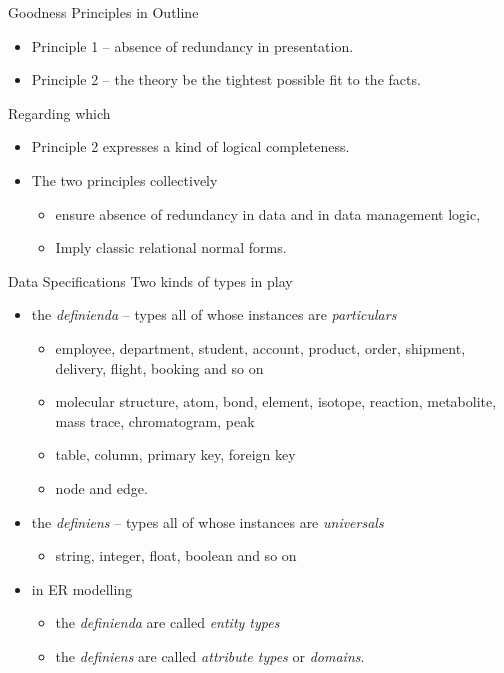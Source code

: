 

\begin{frame}{Goodness Principles in Outline}
\begin{itemize}
    \item Principle 1 -- absence of redundancy in presentation.
    \item Principle 2 -- the theory be the tightest possible fit to the facts.
\end{itemize}

Regarding which
\begin{itemize}
    \item Principle 2 expresses a kind of logical completeness.
    \item The two principles collectively
    \begin{itemize}
        \item ensure absence of redundancy in data and in data management logic,
        \item Imply classic relational normal forms.
    \end{itemize}
\end{itemize}
\end{frame}

\begin{frame}{Data Specifications}
Two kinds of types in play
\begin{itemize}
\item  the \textit{definienda} -- types all of whose instances are \textit{particulars}
\begin{itemize}
\item employee, department, student, account, product, order, shipment, delivery, flight, booking and so on
\item molecular structure, atom, bond, element, isotope, reaction, metabolite, mass trace, chromatogram, peak
\item table, column, primary key, foreign key
\item node and edge. 
\end{itemize}
\pause 
\item  the \textit{definiens}  -- types all of whose instances are \textit{universals}
\begin{itemize}
       \item string, integer, float, boolean and so on
\end{itemize}
\end{itemize}
\pause
\begin{itemize}
\item in ER modelling 
\begin{itemize}
\item the \textit{definienda} are called \textit{entity types}
\item the \textit{definiens} are called \textit{attribute types} or \textit{domains}.
\end{itemize}
\end{itemize}
\end{frame}

